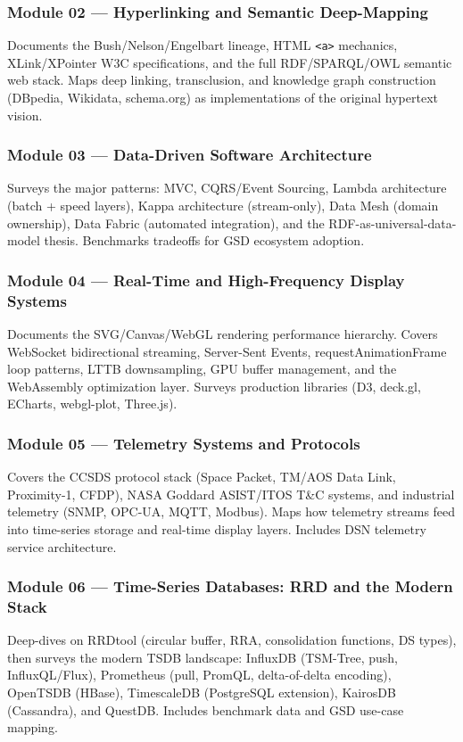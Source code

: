 \documentclass[11pt,letterpaper]{article}
\begin{document}
\subsubsection{Module 02 --- Hyperlinking and Semantic Deep-Mapping}
Documents the Bush/Nelson/Engelbart lineage, HTML \texttt{<a>} mechanics, XLink/XPointer W3C specifications, and the full RDF/SPARQL/OWL semantic web stack. Maps deep linking, transclusion, and knowledge graph construction (DBpedia, Wikidata, schema.org) as implementations of the original hypertext vision.

\subsubsection{Module 03 --- Data-Driven Software Architecture}
Surveys the major patterns: MVC, CQRS/Event Sourcing, Lambda architecture (batch + speed layers), Kappa architecture (stream-only), Data Mesh (domain ownership), Data Fabric (automated integration), and the RDF-as-universal-data-model thesis. Benchmarks tradeoffs for GSD ecosystem adoption.

\subsubsection{Module 04 --- Real-Time and High-Frequency Display Systems}
Documents the SVG/Canvas/WebGL rendering performance hierarchy. Covers WebSocket bidirectional streaming, Server-Sent Events, requestAnimationFrame loop patterns, LTTB downsampling, GPU buffer management, and the WebAssembly optimization layer. Surveys production libraries (D3, deck.gl, ECharts, webgl-plot, Three.js).

\subsubsection{Module 05 --- Telemetry Systems and Protocols}
Covers the CCSDS protocol stack (Space Packet, TM/AOS Data Link, Proximity-1, CFDP), NASA Goddard ASIST/ITOS T\&C systems, and industrial telemetry (SNMP, OPC-UA, MQTT, Modbus). Maps how telemetry streams feed into time-series storage and real-time display layers. Includes DSN telemetry service architecture.

\subsubsection{Module 06 --- Time-Series Databases: RRD and the Modern Stack}
Deep-dives on RRDtool (circular buffer, RRA, consolidation functions, DS types), then surveys the modern TSDB landscape: InfluxDB (TSM-Tree, push, InfluxQL/Flux), Prometheus (pull, PromQL, delta-of-delta encoding), OpenTSDB (HBase), TimescaleDB (PostgreSQL extension), KairosDB (Cassandra), and QuestDB. Includes benchmark data and GSD use-case mapping.
\end{document}
